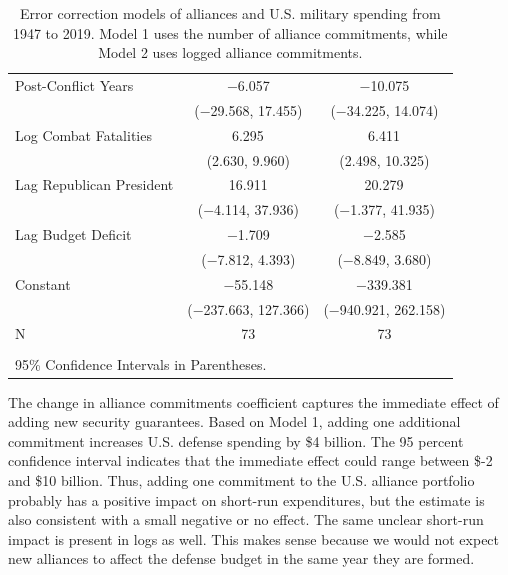 \documentclass[12pt]{article}
\begin{document}
\begin{table}[!htbp]
\begin{adjustbox}{width= .95\textwidth, center}
\begin{tabular}{@{\extracolsep{5pt}}lcc}
  Post-Conflict Years & $-$6.057 & $-$10.075 \\ 
  & ($-$29.568, 17.455) & ($-$34.225, 14.074) \\ 
  Log Combat Fatalities & 6.295$^{}$ & 6.411$^{}$ \\ 
  & (2.630, 9.960) & (2.498, 10.325) \\ 
  Lag Republican President & 16.911 & 20.279$^{}$ \\ 
  & ($-$4.114, 37.936) & ($-$1.377, 41.935) \\ 
  Lag Budget Deficit & $-$1.709 & $-$2.585 \\ 
  & ($-$7.812, 4.393) & ($-$8.849, 3.680) \\ 
  Constant & $-$55.148 & $-$339.381 \\ 
  & ($-$237.663, 127.366) & ($-$940.921, 262.158) \\ 
 N & 73 & 73 \\ 
\hline \\[-1.8ex] 
\multicolumn{3}{l}{95\% Confidence Intervals in Parentheses.} \\ 
\end{tabular} 
\end{adjustbox}
  \caption{Error correction models of alliances and U.S. military spending from 1947 to 2019. 
  Model 1 uses the number of alliance commitments, while Model 2 uses logged alliance commitments.} 
  \label{tab:ecm-coefs}
\end{table} 


The change in alliance commitments coefficient captures the immediate effect of adding new security guarantees.
Based on Model 1, adding one additional commitment increases U.S. defense spending by \$4 billion.
The 95 percent confidence interval indicates that the immediate effect could range between \$-2 and \$10 billion.
Thus, adding one commitment to the U.S. alliance portfolio probably has a positive impact on short-run expenditures, but the estimate is also consistent with a small negative or no effect. 
The same unclear short-run impact is present in logs as well. 
This makes sense because we would not expect new alliances to affect the defense budget in the same year they are formed.
\end{document}
